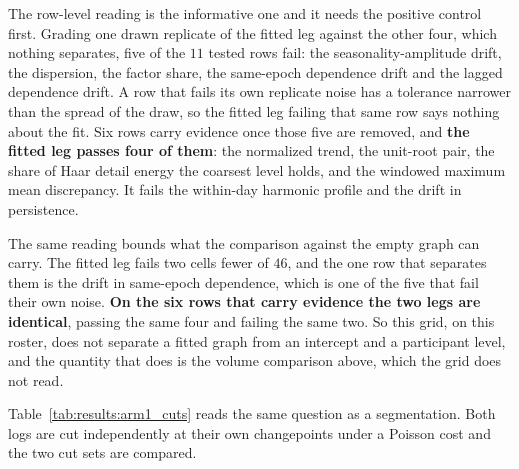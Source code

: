 The row-level reading is the informative one and it needs the positive control
first. Grading one drawn replicate of the fitted leg against the other four,
which nothing separates, five of the $11$ tested rows fail: the
seasonality-amplitude drift, the dispersion, the factor share, the same-epoch
dependence drift and the lagged dependence drift. A row that fails its own
replicate noise has a tolerance narrower than the spread of the draw, so the
fitted leg failing that same row says nothing about the fit. Six rows carry
evidence once those five are removed, and \textbf{the fitted leg passes four of
them}: the normalized trend, the unit-root pair, the share of Haar detail energy
the coarsest level holds, and the windowed maximum mean discrepancy. It fails
the within-day harmonic profile and the drift in persistence.

The same reading bounds what the comparison against the empty graph can carry.
The fitted leg fails two cells fewer of $46$, and the one row that separates
them is the drift in same-epoch dependence, which is one of the five that fail
their own noise. \textbf{On the six rows that carry evidence the two legs are
identical}, passing the same four and failing the same two. So this grid, on
this roster, does not separate a fitted graph from an intercept and a
participant level, and the quantity that does is the volume comparison above,
which the grid does not read.

Table~\ref{tab:results:arm1_cuts} reads the same question as a segmentation.
Both logs are cut independently at their own changepoints under a Poisson cost
and the two cut sets are compared.

